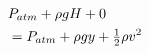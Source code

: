 \documentclass[preview]{standalone}
\begin{document}
\begin{align*}
\special{dvisvgm:raw <g id='unique000'>}& P_{atm} + \rho g H + 0 \\ & = P_{atm} + \rho g y + \tfrac{1}{2} \rho v^2\special{dvisvgm:raw </g>}
\end{align*}
\end{document}
